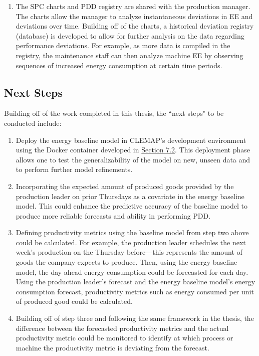 \begin{enumerate}
    \item The SPC charts and PDD registry are shared with the production manager. The charts allow the manager to analyze instantaneous deviations in EE and deviations over time. Building off of the charts, a historical deviation registry (database) is developed to allow for further analysis on the data regarding performance deviations. For example, as more data is compiled in the registry, the maintenance staff can then analyze machine EE by observing sequences of increased energy consumption at certain time periods.
    
\end{enumerate}

\subsection{Next Steps}

Building off of the work completed in this thesis, the ``next steps" to be conducted include:

\begin{enumerate}

    \item Deploy the energy baseline model in CLEMAP's development environment using the Docker container developed in \hyperlink{subsection.7.2}{Section 7.2}. This deployment phase allows one to test the generalizability of the model on new, unseen data and to perform further model refinements. 

    \item Incorporating the expected amount of produced goods provided by the production leader on prior Thursdays as a covariate in the energy baseline model. This could enhance the predictive accuracy of the baseline model to produce more reliable forecasts and ability in performing PDD.
    
    \item Defining productivity metrics using the baseline model from step two above could be calculated. For example, the production leader schedules the next week's production on the Thursday before—this represents the amount of goods the company expects to produce. Then, using the energy baseline model, the day ahead energy consumption could be forecasted for each day. Using the production leader's forecast and the energy baseline model's energy consumption forecast, productivity metrics such as energy consumed per unit of produced good could be calculated.
    
    \item Building off of step three and following the same framework in the thesis, the difference between the forecasted productivity metrics and the actual productivity metric could be monitored to identify at which process or machine the productivity metric is deviating from the forecast.
\end{enumerate}